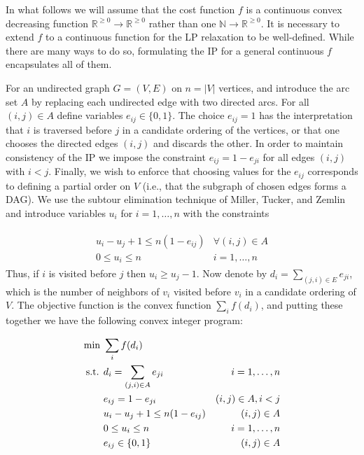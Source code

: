 \documentclass[english]{llncs}
\begin{document}
In what follows we will assume that the cost function $f$ is a continuous
convex decreasing function $\mathbb{R}^{\geq 0} \to \mathbb{R}^{\geq 0}$ rather
than one $\mathbb{N} \to \mathbb{R}^{\geq 0}$. It is necessary to extend $f$ to
a continuous function for the LP relaxation to be well-defined.  While there
are many ways to do so, formulating the IP for a general continuous $f$
encapsulates all of them.

For an undirected graph $G = (V,E)$ on $n = |V|$ vertices, and introduce the
arc set $A$ by replacing each undirected edge with two directed arcs.  For all
$(i,j)\in A$ define variables $e_{ij} \in \{ 0,1 \}$.  The choice $e_{ij} = 1$
has the interpretation that $i$ is traversed before $j$ in a candidate ordering
of the vertices, or that one chooses the directed edges $(i,j)$ and discards
the other. In order to maintain consistency of the IP we impose the constraint
$e_{ij} = 1 - e_{ji}$ for all edges $(i,j)$ with $i < j$. Finally, we wish to
enforce that choosing values for the $e_{ij}$ corresponds to defining a partial
order on $V$ (i.e., that the subgraph of chosen edges forms a DAG). We use the
subtour elimination technique of Miller, Tucker, and Zemlin
\cite{miller1960integer} and introduce variables $u_i$ for $i = 1, \dots, n$
with the constraints

\begin{align}
\label{eq:dag-constraint}
\begin{matrix}
   u_i - u_j + 1 \leq n (1 - e_{ij}) & \forall (i,j) \in A \\ 
   0 \leq u_i \leq n & i = 1, \dots, n 
\end{matrix}
\end{align}
\noindent Thus, if $i$ is visited before $j$ then $u_i \geq u_j - 1$.
Now denote by $d_i = \sum_{(j,i) \in E} e_{ji}$, which is the number of
neighbors of $v_i$ visited before $v_i$ in a candidate ordering of $V$. The
objective function is the convex function $\sum_{i} f(d_i)$, and putting these
together we have the following convex integer program: 

\begin{figure}[th]
\begin{centering}
\begin{align*}
\textup{min }  & \sum_i f(d_i)                       & \\ 
\textup{s.t. } & d_i = \sum_{(j,i) \in A} e_{ji}     & i = 1, \dots, n \\ 
               & e_{ij} = 1 - e_{ji}                 & (i,j) \in A, i < j \\ 
               & u_i - u_j + 1 \leq n (1 - e_{ij})   & (i,j) \in A \\ 
               & 0 \leq u_i \leq n                   & i = 1, \dots, n \\ 
               & e_{ij} \in \{0,1\}                    & (i,j) \in A
\end{align*}
\end{centering}
\end{figure}
\end{document}
